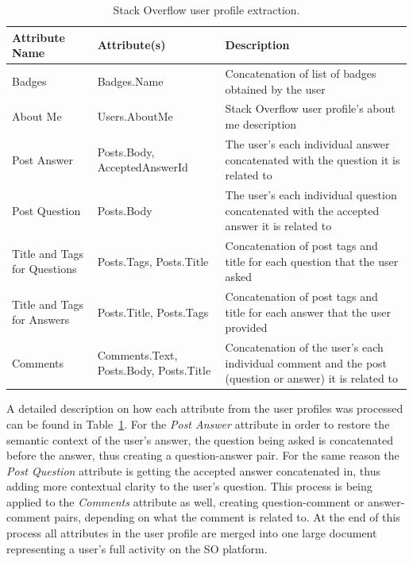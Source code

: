         \begin{table}[!htbp]
            \centering
            \label{tab:SO_userProfileExtraction}
            \caption{Stack Overflow user profile extraction.}
            \vspace{6pt} %
            \begin{tabular}{|p{3.3cm}|p{2.7cm}|p{8cm}|}
               \toprule
               \textbf{Attribute Name} & \textbf{Attribute(s)} & \textbf{Description} \\
               \toprule
                Badges & Badges.Name & Concatenation of list of badges obtained by the user \\
                About Me & Users.AboutMe & Stack Overflow user profile's about me description \\
                Post Answer & Posts.Body, AcceptedAnswerId & The user's each individual answer concatenated with the question it is related to  \\
                Post Question & Posts.Body & The user's each individual question concatenated with the accepted answer it is related to \\
                Title and Tags for Questions & Posts.Tags, Posts.Title & Concatenation of post tags and title for each question that the user asked \\
                Title and Tags for Answers & Posts.Title, Posts.Tags & Concatenation of post tags and title for each answer that the user provided \\
                Comments & Comments.Text, Posts.Body, Posts.Title & Concatenation of the user's each individual comment and the post (question or answer) it is related to \\
               \bottomrule
            \end{tabular}
        \end{table} 
        
        A detailed description on how each attribute from the user profiles was processed can be found in Table~\ref{tab:SO_userProfileExtraction}. For the \textit{Post Answer} attribute in order to restore the semantic context of the user's answer, the question being asked is concatenated before the answer, thus creating a question-answer pair. For the same reason the \textit{Post Question} attribute is getting the accepted answer concatenated in, thus adding more contextual clarity to the user's question. This process is being applied to the \textit{Comments} attribute as well, creating question-comment or answer-comment pairs, depending on what the comment is related to. At the end of this process all attributes in the user profile are merged into one large document representing a user's full activity on the SO platform. 
        
